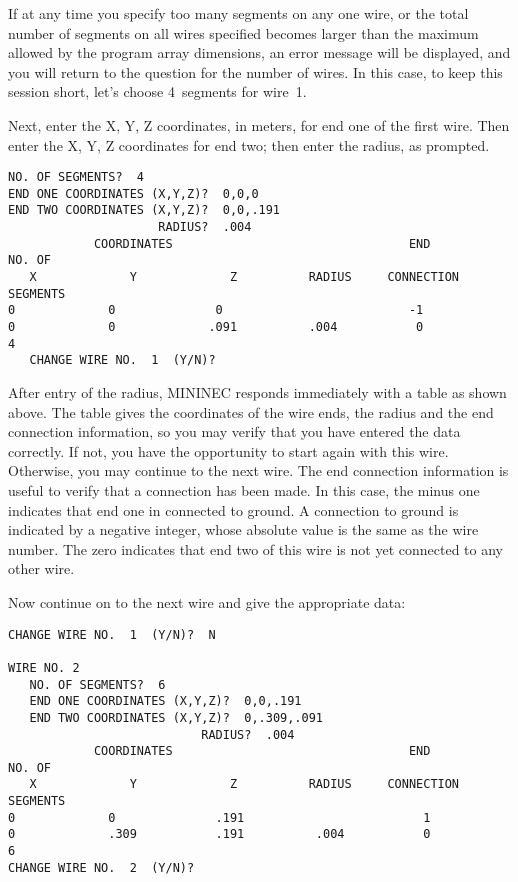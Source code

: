 \documentclass[12pt]{article}
\begin{document}
If at any time you specify too many segments on any one wire, or the
total number of segments on all wires specified becomes larger than the
maximum allowed by the program array dimensions, an error message will
be displayed, and you will return to the question for the number of
wires. In this case, to keep this session short, let's choose 4~segments
for wire~1.

Next, enter the X, Y, Z coordinates, in meters, for end one of the first
wire. Then enter the X, Y, Z coordinates for end two; then enter the
radius, as prompted.

\begin{Verbatim}
NO. OF SEGMENTS?  4
END ONE COORDINATES (X,Y,Z)?  0,0,0
END TWO COORDINATES (X,Y,Z)?  0,0,.191
                     RADIUS?  .004
            COORDINATES                                 END         NO. OF
   X             Y             Z          RADIUS     CONNECTION     SEGMENTS
0             0              0                          -1
0             0             .091          .004           0             4
   CHANGE WIRE NO.  1  (Y/N)?
\end{Verbatim}

After entry of the radius, MININEC responds immediately with a table as
shown above. The table gives the coordinates of the wire ends, the
radius and the end connection information, so you may verify that you
have entered the data correctly. If not, you have the opportunity to
start again with this wire. Otherwise, you may continue to the next
wire. The end connection information is useful to verify that a
connection has been made. In this case, the minus one indicates that end
one in connected to ground. A connection to ground is indicated by a
negative integer, whose absolute value is the same as the wire number.
The zero indicates that end two of this wire is not yet connected to any
other wire.

Now continue on to the next wire and give the appropriate data:

\begin{Verbatim}
CHANGE WIRE NO.  1  (Y/N)?  N

WIRE NO. 2
   NO. OF SEGMENTS?  6
   END ONE COORDINATES (X,Y,Z)?  0,0,.191
   END TWO COORDINATES (X,Y,Z)?  0,.309,.091
                           RADIUS?  .004
            COORDINATES                                 END         NO. OF
   X             Y             Z          RADIUS     CONNECTION     SEGMENTS
0             0              .191                         1
0             .309           .191          .004           0            6
CHANGE WIRE NO.  2  (Y/N)?
\end{Verbatim}
\end{document}
